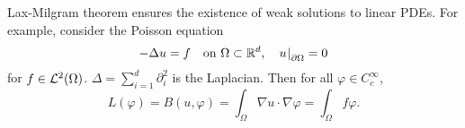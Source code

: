 \begin{remark}
    Lax-Milgram theorem ensures the existence of weak solutions to 
    linear PDEs. For example, consider the Poisson equation 
    \begin{equation*}
        -\Delta u = f \quad \text{on }\Omega\subset\mathbb{R}^d, \quad u\left.\hspace{-0.2em}\right|_{\partial\Omega} = 0
    \end{equation*}
    for $f\in\mathcal{L}^2(\Omega)$. $\Delta = \sum_{i=1}^{d}\partial_i^2$ is 
    the Laplacian. Then for all $\varphi\in C^\infty_c$, 
    \begin{equation*}
        L(\varphi) = B(u,\varphi) = \int_{\Omega} \nabla u\cdot\nabla\varphi = \int_{\Omega} f\varphi.
    \end{equation*} 
\end{remark}